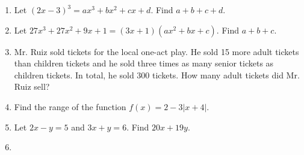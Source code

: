 \documentclass[../uilmath.tex]{subfiles}
\begin{document}
\begin{enumerate}[label=\bfseries\arabic*.]
        \item %
        Let $(2x-3)^3=ax^3+bx^2+cx+d$. Find $a+b+c+d$.

        \item %
        Let $27x^3+27x^2+9x+1=(3x+1)(ax^2+bx+c)$. Find $a+b+c$.

        \item %
        Mr. Ruiz sold tickets for the local one-act play. He sold 15 more adult tickets than children tickets and he sold three times as many senior tickets as children tickets. In total, he sold 300 tickets. How many adult tickets did Mr. Ruiz sell?

        \item %
        Find the range of the function $f(x)=2-3|x+4|$.

        \item %
        Let $2x-y=5$ and $3x+y=6$. Find $20x+19y$.

        \item %
        
\end{enumerate}
\end{document}
